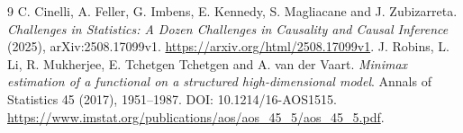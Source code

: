 \documentclass[11pt]{article}
\theoremstyle{definition}
\begin{document}
\begin{thebibliography}{9}
 C. Cinelli, A. Feller, G. Imbens, E. Kennedy, S. Magliacane and J. Zubizarreta.
\emph{Challenges in Statistics: A Dozen Challenges in Causality and Causal Inference} (2025), arXiv:2508.17099v1.
\url{https://arxiv.org/html/2508.17099v1}.
 J. Robins, L. Li, R. Mukherjee, E. Tchetgen Tchetgen and A. van der Vaart.
\emph{Minimax estimation of a functional on a structured high-dimensional model}.
Annals of Statistics 45 (2017), 1951--1987. DOI: 10.1214/16-AOS1515.
\url{https://www.imstat.org/publications/aos/aos_45_5/aos_45_5.pdf}.
\end{thebibliography}
\end{document}
